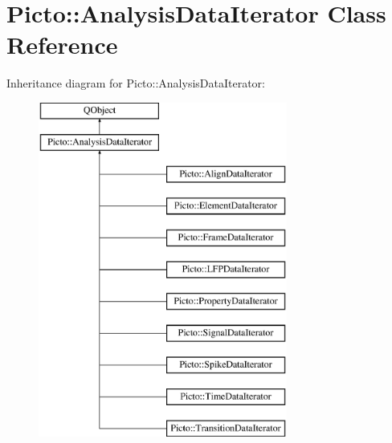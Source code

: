 \hypertarget{class_picto_1_1_analysis_data_iterator}{\section{Picto\-:\-:Analysis\-Data\-Iterator Class Reference}
\label{class_picto_1_1_analysis_data_iterator}
}
Inheritance diagram for Picto\-:\-:Analysis\-Data\-Iterator\-:\begin{figure}[H]
\begin{center}
\leavevmode
\includegraphics[height=11.000000cm]{class_picto_1_1_analysis_data_iterator}
\end{center}
\end{figure}
